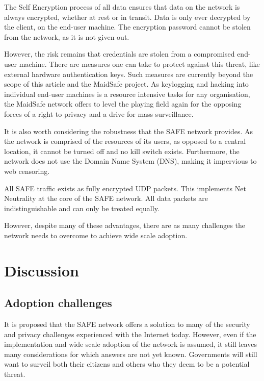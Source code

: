 \documentclass[twocolumn,english]{article}
\begin{document}
The Self Encryption process of all data ensures that data on the network is
always encrypted, whether at rest or in transit. Data is only
ever decrypted by the client, on the end-user machine.  The encryption
password cannot be stolen from the network, as it is not given out.  

However, the risk remains that credentials are stolen from a compromised end-user machine.  There are measures one can take to protect against this threat, like external hardware authentication keys.  Such measures are currently beyond the scope of this article and the MaidSafe project.  As keylogging and hacking into individual end-user machines is a resource intensive tasks for any organisation, the MaidSafe network offers to level the playing field again for the opposing forces of a right to privacy and a drive for mass surveillance.

It is also worth considering the robustness that the SAFE network
provides. As the network is comprised of the resources of its users,
as opposed to a central location, it cannot be turned off and no kill
switch exists. Furthermore, the network does not use the Domain Name
System (DNS), making it impervious to web censoring. %

All SAFE traffic exists as fully encrypted UDP packets. This implements Net Neutrality at the core of the SAFE network.  All data packets are indistinguishable and can only be treated equally.

However, despite many of these advantages, there
are as many challenges the network needs to overcome to achieve
wide scale adoption.


\section{Discussion}

\subsection{Adoption challenges}

It is proposed that the SAFE network offers a solution to many of
the security and privacy challenges experienced with the Internet
today. However, even if the implementation and wide scale adoption
of the network is assumed, it still leaves many considerations for
which answers are not yet known. Governments will still want to surveil
both their citizens and others who they deem to be a potential threat.
\end{document}
